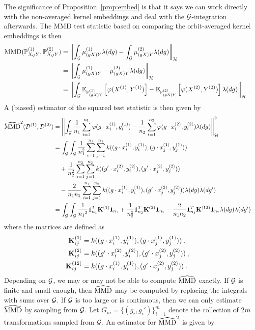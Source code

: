 The significance of Proposition~\ref{prop:embed} is that it says we can work directly with the non-averaged kernel embeddings and deal with the $\mathcal{G}$-integration afterwards. The MMD test statistic based on comparing the orbit-averaged kernel embeddings is then
\begin{align*}
\mathrm{MMD}(\mathbb{P}_{X_{\mathcal{G}} Y}^{(1)},\mathbb{P}_{X_{\mathcal{G}} Y}^{(2)}) &= \left\|\int_{\mathcal{G}}\mu_{(gX)Y}^{(1)}\lambda(dg) - \int_{\mathcal{G}}\mu_{(gX)Y}^{(2)}\lambda(dg)\right\|_{\mathcal{H}} \\
&= \left\|\int_{\mathcal{G}}\mu_{(gX)Y}^{(1)} - \mu_{(gX)Y}^{(2)}\lambda(dg)\right\|_{\mathcal{H}} \\
&= \left\|\int_{\mathcal{G}}\mathbb{E}_{\mathbb{P}_{(gX)Y}^{(1)}}\left[\varphi(X^{(1)},Y^{(1)})\right] - \mathbb{E}_{\mathbb{P}_{(gX)Y}^{(2)}}\left[\varphi(X^{(2)},Y^{(2)})\right]\lambda(dg)\right\|_{\mathcal{H}} \;.
\end{align*}
A (biased) estimator of the squared test statistic is then given by
\begin{align*}
\widehat{\mathrm{MMD}}^2(\mathcal{D}^{(1)},\mathcal{D}^{(2)}) &= \left\|\int_{\mathcal{G}}\frac{1}{n_1}\sum_{i=1}^{n_1}\varphi(g\cdot x^{(1)}_i,y^{(1)}_i) - \frac{1}{n_2}\sum_{i=1}^{n_2}\varphi(g\cdot x^{(2)}_i,y^{(2)}_i)\lambda(dg)\right\|_{\mathcal{H}}^2 \\
&= \int_{\mathcal{G}}\int_{\mathcal{G}} \frac{1}{n_1^2}\sum_{i=1}^{n_1}\sum_{j=1}^{n_1}k((g\cdot x^{(1)}_i,y^{(1)}_i),(g\cdot x^{(1)}_j,y^{(1)}_j)) \\
&\quad + \frac{1}{n_2^2}\sum_{i=1}^{n_2}\sum_{j=1}^{n_2}k((g'\cdot x^{(2)}_i, y^{(2)}_i),(g'\cdot x^{(2)}_j, y^{(2)}_j)) \\
&\quad - \frac{2}{n_1n_2}\sum_{i=1}^{n_1}\sum_{j=1}^{n_2}k((g\cdot x^{(1)}_i, y^{(1)}_i),(g'\cdot x^{(2)}_j, y^{(2)}_j)) \lambda(dg)\lambda(dg') \\
&= \int_{\mathcal{G}}\int_{\mathcal{G}} \frac{1}{{n_1}^2}\mathbf{1}_{n_1}^T\mathbf{K}^{(1)}\mathbf{1}_{n_1} + \frac{1}{n_2^2}\mathbf{1}_{n_2}^T\mathbf{K}^{(2)}\mathbf{1}_{n_2} - \frac{2}{n_1n_2}\mathbf{1}_{n_1}^T\mathbf{K}^{(12)}\mathbf{1}_{n_2} \lambda(dg)\lambda(dg')
\end{align*}
where the matrices are defined as
\begin{align*}
\mathbf{K}^{(1)}_{ij} &= k((g\cdot x^{(1)}_i,y^{(1)}_i),(g\cdot x^{(1)}_j,y^{(1)}_j)) \;, \\
\mathbf{K}^{(2)}_{ij} &= k((g'\cdot x^{(2)}_i, y^{(2)}_i),(g'\cdot x^{(2)}_j, y^{(2)}_j)) \;, \\
\mathbf{K}^{(12)}_{ij} &= k((g\cdot x^{(1)}_i, y^{(1)}_i),(g'\cdot x^{(2)}_j, y^{(2)}_j)) \;.
\end{align*}
Depending on $\mathcal{G}$, we may or may not be able to compute $\widehat{\mathrm{MMD}}$ exactly. If $\mathcal{G}$ is finite and small enough, then $\widehat{\mathrm{MMD}}$ may be computed by replacing the integrals with sums over $\mathcal{G}$. If $\mathcal{G}$ is too large or is continuous, then we can only estimate $\widehat{\mathrm{MMD}}$ by sampling from $\mathcal{G}$. Let $G_m=\{(g_i,g_i')\}_{i=1}^m$ denote the collection of $2m$ transformations sampled from $\mathcal{G}$. An estimator for $\widehat{\mathrm{MMD}}^2$ is given by
